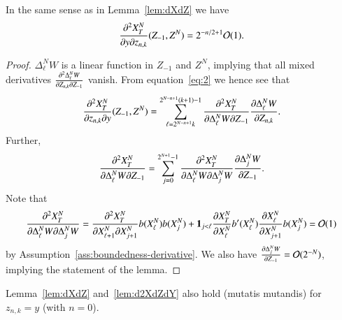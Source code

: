\documentclass{amsart}
\begin{document}
\begin{lemma}
  \label{lem:d2XdZdY}
  In the same sense as in Lemma~\ref{lem:dXdZ} we have
  \begin{equation*}
    \frac{\partial^2 X^N_T}{\partial y \partial z_{n,k}}(Z_{-1}, Z^N) = 2^{-n/2+1} \mathcal{O}(1).
  \end{equation*}
\end{lemma}
\begin{proof}
  $\Delta^N_\ell W$ is a linear function in $Z_{-1}$ and $Z^N$, implying that
  all mixed derivatives $\frac{\partial^2\Delta^N_\ell W}{\partial Z_{n,k} \partial Z_{-1}}$ vanish.
  From equation~\eqref{eq:2} we hence see that
  \begin{equation*}
    \frac{\partial^2 X^N_T}{\partial z_{n,k} \partial y}(Z_{-1}, Z^N) =
    \sum_{\ell=2^{N-n+1}k}^{2^{N-n+1}(k+1)-1} \frac{\partial^2 X^N_T}{\partial \Delta^N_\ell
      W \partial Z_{-1}} \frac{\partial \Delta^N_\ell W}{\partial Z_{n,k} }.
  \end{equation*}
  Further,
  \begin{equation*}
    \frac{\partial^2 X^N_T}{\partial \Delta^N_\ell W \partial Z_{-1}} = \sum_{j=0}^{2^{N+1}-1}
    \frac{\partial^2 X^N_T}{\partial \Delta^N_\ell W \partial \Delta^N_j W} \frac{\partial \Delta^N_j W}{\partial
      Z_{-1}}.
  \end{equation*}
  Note that
  \begin{equation}
    \label{eq:d2XdWdW}
    \frac{\partial^2 X^N_T}{\partial \Delta^N_\ell W \partial \Delta^N_j W} = \frac{\partial^2
      X^N_T}{\partial X^N_{\ell+1} \partial X^N_{j+1}} b(X^N_\ell) b(X^N_j) + \mathbf{1}_{j
      < \ell} \frac{\partial X^N_T}{\partial X_\ell^N} b^\prime(X^N_\ell) \frac{\partial
      X^N_\ell}{\partial X^N_{j+1}} b(X^N_j) = \mathcal{O}(1)
  \end{equation}
  by Assumption~\ref{ass:boundedness-derivative}. We also have $\frac{\partial \Delta^N_j W}{\partial
    Z_{-1}} = \mathcal{O}(2^{-N})$, implying the statement of the lemma.
\end{proof}

\begin{remark}
  Lemma~\ref{lem:dXdZ} and~\ref{lem:d2XdZdY} also hold (mutatis mutandis) for
  $z_{n,k} = y$ (with $n = 0$).  
\end{remark}
\end{document}
